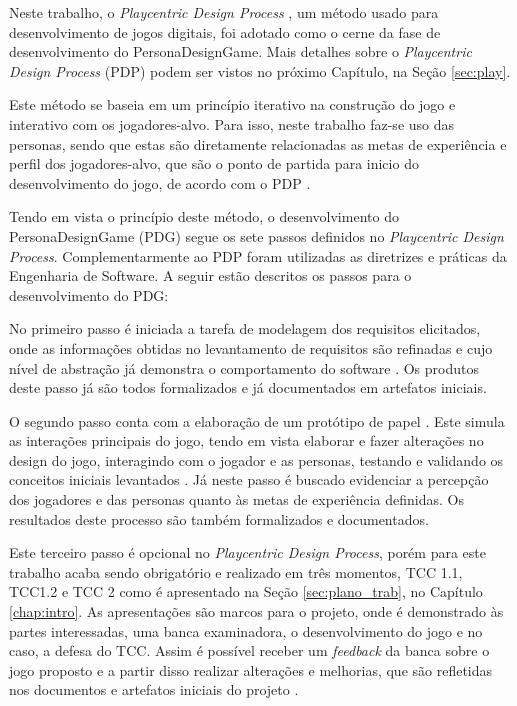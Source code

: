 Neste trabalho, o \textit{Playcentric Design Process} \cite{Fullerton_2008}, um método usado para desenvolvimento de jogos digitais, foi adotado como o cerne da fase de desenvolvimento do PersonaDesignGame. Mais detalhes sobre o \textit{Playcentric Design Process} (PDP) podem ser vistos no próximo Capítulo, na Seção \ref{sec:play}.

Este método se baseia em um princípio iterativo na construção do jogo e interativo com os jogadores-alvo. Para isso, neste trabalho faz-se uso das personas, sendo que estas são diretamente relacionadas as metas de experiência e perfil dos jogadores-alvo, que são o ponto de partida para inicio do desenvolvimento do jogo, de acordo com o PDP .

Tendo em vista o princípio deste método, o desenvolvimento do PersonaDesignGame (PDG) segue os sete passos definidos no \textit{Playcentric Design Process}. Complementarmente ao PDP foram utilizadas as diretrizes e práticas da Engenharia de Software. A seguir estão descritos os passos para o desenvolvimento do PDG: 

No primeiro passo é iniciada a tarefa de modelagem dos requisitos elicitados, onde as informações obtidas no levantamento de requisitos são refinadas e cujo nível de abstração já demonstra o comportamento do software \cite[p. 128]{Pressman_2000}. Os produtos deste passo já são todos formalizados e já documentados em artefatos iniciais.
   
O segundo passo conta com a elaboração de um protótipo de papel \cite[p. 262, 263]{Preece_Rogers_Sharp_2005}. Este simula as interações principais do jogo, tendo em vista elaborar e fazer alterações no design do jogo, interagindo com o jogador e as personas, testando e validando os conceitos iniciais levantados \cite[p. 15]{Fullerton_2008}. Já neste passo é buscado evidenciar a percepção dos jogadores e das personas quanto às metas de experiência definidas. Os resultados deste processo são também formalizados e documentados.

Este terceiro passo é opcional no \textit{Playcentric Design Process}, porém para este trabalho acaba sendo obrigatório e realizado em três momentos, TCC 1.1, TCC1.2 e TCC 2 como é apresentado na Seção \ref{sec:plano_trab}, no Capítulo \ref{chap:intro}. As apresentações são marcos para o projeto, onde é demonstrado às partes interessadas, uma banca examinadora, o desenvolvimento do jogo e no caso, a defesa do TCC. Assim é possível receber um \textit{feedback} da banca sobre o jogo proposto e a partir disso realizar alterações e melhorias, que são refletidas nos documentos e artefatos iniciais do projeto \cite[p. 15]{Fullerton_2008}. 

